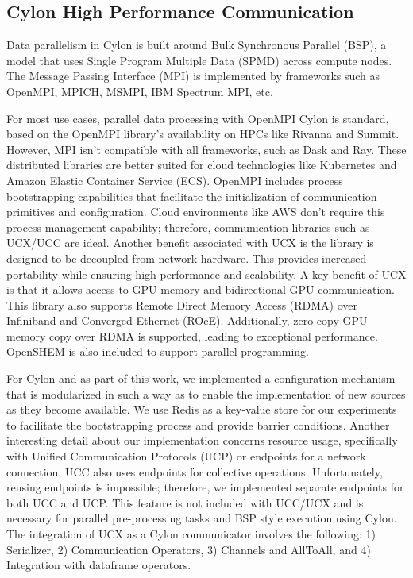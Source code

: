 \subsection{Cylon High Performance Communication}
Data parallelism in Cylon is built around Bulk Synchronous Parallel (BSP), a model that uses Single Program Multiple Data (SPMD) across compute nodes.  The Message Passing Interface (MPI) is implemented by frameworks such as OpenMPI, MPICH, MSMPI, IBM Spectrum MPI, etc.

For most use cases, parallel data processing with OpenMPI Cylon is standard, based on the OpenMPI library’s availability on HPCs like Rivanna and Summit. However, MPI isn’t compatible with all frameworks, such as Dask and Ray. These distributed libraries are better suited for cloud technologies like Kubernetes and Amazon Elastic Container Service (ECS). OpenMPI includes process bootstrapping capabilities that facilitate the initialization of communication primitives and configuration. Cloud environments like AWS don't require this process management capability; therefore, communication libraries such as UCX/UCC are ideal.  Another benefit associated with UCX is the library is designed to be decoupled from network hardware.  This provides increased portability while ensuring high performance and scalability.  A key benefit of UCX is that it allows access to GPU memory and bidirectional GPU communication.  This library also supports Remote Direct Memory Access (RDMA) over Infiniband and Converged Ethernet (ROcE).  Additionally, zero-copy GPU memory copy over RDMA is supported, leading to exceptional performance.  OpenSHEM is also included to support parallel programming\cite{shan2022hybrid}.

For Cylon and as part of this work, we implemented a configuration mechanism that is modularized in such a way as to enable the implementation of new sources as they become available. We use Redis as a key-value store for our experiments to facilitate the bootstrapping process and provide barrier conditions.
Another interesting detail about our implementation concerns resource usage, specifically with Unified Communication Protocols (UCP) or endpoints for a network connection.  UCC also uses endpoints for collective operations. Unfortunately, reusing endpoints is impossible; therefore, we implemented separate endpoints for both UCC and UCP. This feature is not included with UCC/UCX and is necessary for parallel pre-processing tasks and BSP style execution using Cylon. The integration of UCX as a Cylon communicator involves the following: 1) Serializer, 2) Communication Operators, 3) Channels and AllToAll, and 4) Integration with dataframe operators\cite{shan2022hybrid}.  

